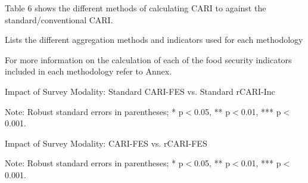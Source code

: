 \documentclass[11pt,harvard]{article}
\begin{document}
Table 6 shows the different methods of calculating CARI to against the standard/conventional CARI.


\begin{table}[htbp]
	\centering
	\begin{adjustbox}{max width=\textwidth}
		\begin{threeparttable}
			\caption{Lists the different aggregation methods and indicators used for each methodology}
			\scriptsize
			 
			\label{tab:Aggregation_Table}
		\end{threeparttable}
	\end{adjustbox}
\end{table}

For more information on the calculation of each of the food security indicators included in each methodology refer to Annex. 



	\begin{table}[htbp]
		\centering
		\begin{adjustbox}{max width=\textwidth}
			\begin{threeparttable}
				\caption{Impact of Survey Modality: Standard CARI-FES vs. Standard rCARI-Inc}
				\scriptsize
				 
				\label{tab:CARI_rCARI_Modality_CAR}
				\begin{tablenotes}
					\item Note: Robust standard errors in parentheses; * p$<$0.05, ** p$<$0.01, *** p$<$0.001. 
				\end{tablenotes}
			\end{threeparttable}
		\end{adjustbox}
	\end{table}
	
	
	\begin{table}[htbp]
		\centering
		\begin{adjustbox}{max width=\textwidth}
			\begin{threeparttable}
				\caption{Impact of Survey Modality: CARI-FES vs. rCARI-FES}
				\scriptsize
				 
				\label{tab:CARI_FES_rCARI_Modality_CAR}
				\begin{tablenotes}
					\item Note: Robust standard errors in parentheses; * p$<$0.05, ** p$<$0.01, *** p$<$0.001. 
				\end{tablenotes}
			\end{threeparttable}
		\end{adjustbox}
	\end{table}
	
\end{document}
